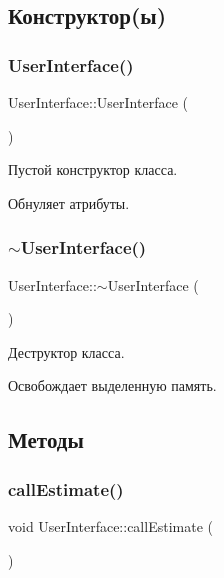 \subsection{Конструктор(ы)}
\hypertarget{class_user_interface_ae6fb70370701b3bd6120e923df9705b0}{}\label{class_user_interface_ae6fb70370701b3bd6120e923df9705b0} 
\subsubsection{\texorpdfstring{User\+Interface()}{UserInterface()}}
{\footnotesize\ttfamily User\+Interface\+::\+User\+Interface (\begin{DoxyParamCaption}{ }\end{DoxyParamCaption})}



Пустой конструктор класса. 

Обнуляет атрибуты. \hypertarget{class_user_interface_ae588b2ff1711a016dd4c6fc5002c0841}{}\label{class_user_interface_ae588b2ff1711a016dd4c6fc5002c0841} 
\subsubsection{\texorpdfstring{$\sim$\+User\+Interface()}{~UserInterface()}}
{\footnotesize\ttfamily User\+Interface\+::$\sim$\+User\+Interface (\begin{DoxyParamCaption}{ }\end{DoxyParamCaption})}



Деструктор класса. 

Освобождает выделенную память. 

\subsection{Методы}
\hypertarget{class_user_interface_a7957201b3543ea0561d48bcc0a0d329e}{}\label{class_user_interface_a7957201b3543ea0561d48bcc0a0d329e} 
\subsubsection{\texorpdfstring{call\+Estimate()}{callEstimate()}}
{\footnotesize\ttfamily void User\+Interface\+::call\+Estimate (\begin{DoxyParamCaption}{ }\end{DoxyParamCaption})\hspace{0.3cm}{\ttfamily [private]}}



